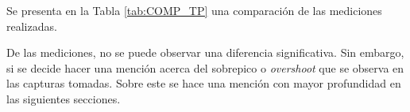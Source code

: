 Se presenta en la Tabla \ref{tab:COMP_TP} una comparaci\'on de las mediciones realizadas.
\begin{table}[H]
    \centering
    \caption{Tabla de comparaci\'on de tiempos de propagaci\'on medidos}
    \label{tab:COMP_TP}
    \end{table}
De las mediciones, no se puede observar una diferencia significativa. Sin embargo, si se decide hacer una menci\'on acerca del sobrepico o \textit{overshoot} que se observa en las capturas tomadas. Sobre este se hace una menci\'on con mayor profundidad en las siguientes secciones.


